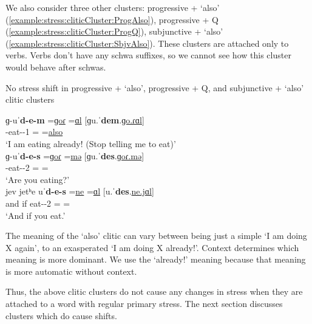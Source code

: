 We also consider three other clusters:  progressive + `also' (\ref{example:stress:cliticCluster:ProgAlso}),  progressive + Q (\ref{example:stress:cliticCluster:ProgQ}), subjunctive + `also' (\ref{example:stress:cliticCluster:SbjvAlso}). These clusters are attached only to verbs. Verbs don't have any schwa suffixes, so we cannot see how this cluster would behave after schwas.  




\begin{exe}
	\ex No stress shift in progressive + `also',  progressive + Q, and subjunctive + `also' clitic clusters 
	\begin{xlist}
		\ex \gll ɡ-uˈ\textbf{d-e-m}  =\underline{ɡoɾ}  =\underline{ɑl}  [ɡu.ˈ\textbf{dem}.\underline{ɡo.ɾɑl}]
		\\
		{\ind}-eat-{\thgloss}-1{\sg} =\underline{{\prog}} =\underline{also}
		\\
		\trans `I am eating already! (Stop telling me to eat)' \label{example:stress:cliticCluster:ProgAlso}
		\\
		\ex \gll ɡ-uˈ\textbf{d-e-s}  =\underline{ɡoɾ}  =\underline{mə}  [ɡu.ˈ\textbf{des}.\underline{ɡoɾ.mə}]
		\\
		{\ind}-eat-{\thgloss}-2{\sg} =\underline{{\prog}} =\underline{{\q}}
		\\
		\trans `Are you eating?' \label{example:stress:cliticCluster:ProgQ}
		\\
		\ex \gll jev jetʰe uˈ\textbf{d-e-s}  =\underline{ne}  =\underline{ɑl}  [u.ˈ\textbf{des}.\underline{ne.jɑl}]
		\\
		and if eat-{\thgloss}-2{\sg} =\underline{{\sbjv}} =\underline{{\q}}
		\\
		\trans `And if you eat.' \label{example:stress:cliticCluster:SbjvAlso}
		\\
		
	\end{xlist}
\end{exe}

The meaning of the `also' clitic can vary between being just a simple `I am doing X again', to an exasperated `I am doing X already!'. Context determines which meaning is more dominant. We use the `already!' meaning because that meaning is more automatic without context. 


Thus, the above clitic clusters do not cause any changes in stress when they are attached to a word with regular primary stress. The next section discusses clusters which do cause shifts. 

